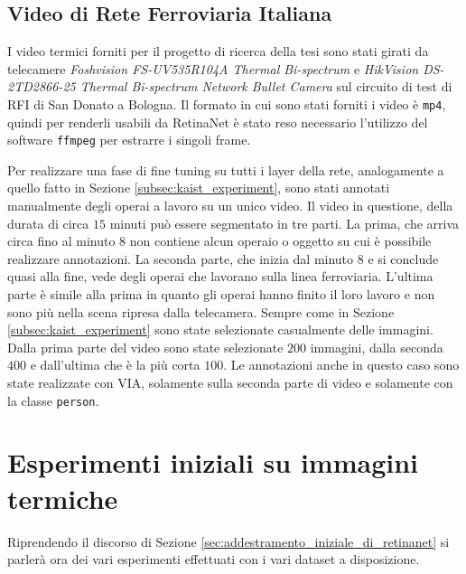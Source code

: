\subsection{Video di Rete Ferroviaria Italiana}
\label{subsec:rfi_video_experiment}
I video termici forniti per il progetto di ricerca della tesi sono stati girati da telecamere \textit{Foshvision FS-UV535R104A Thermal Bi-spectrum} e \textit{HikVision DS-2TD2866-25 Thermal Bi-spectrum Network Bullet Camera} sul circuito di test di \ac{RFI} di San Donato a Bologna.
Il formato in cui sono stati forniti i video è \texttt{mp4}, quindi per renderli usabili da RetinaNet è stato reso necessario l'utilizzo del software \texttt{ffmpeg} per estrarre i singoli frame. 

Per realizzare una fase di fine tuning su tutti i layer della rete, analogamente a quello fatto in Sezione \ref{subsec:kaist_experiment}, sono stati annotati manualmente degli operai a lavoro su un unico video.
Il video in questione, della durata di circa $15$ minuti può essere segmentato in tre parti. La prima, che arriva circa fino al minuto $8$ non contiene alcun operaio o oggetto su cui è possibile realizzare annotazioni. La seconda parte, che inizia dal minuto 8 e si conclude quasi alla fine, vede degli operai che lavorano sulla linea ferroviaria. L'ultima parte è simile alla prima in quanto gli operai hanno finito il loro lavoro e non sono più nella scena ripresa dalla telecamera. 
Sempre come in Sezione \ref{subsec:kaist_experiment} sono state selezionate casualmente delle immagini. Dalla prima parte del video sono state selezionate $200$ immagini, dalla seconda $400$ e dall'ultima che è la più corta $100$. Le annotazioni anche in questo caso sono state realizzate con \ac{VIA}, solamente sulla seconda parte di video e solamente con la classe \texttt{person}.
 

\section{Esperimenti iniziali su immagini termiche}
\label{sec:init_experiment_thermal}
Riprendendo il discorso di Sezione \ref{sec:addestramento_iniziale_di_retinanet} si parlerà ora dei vari esperimenti effettuati con i vari dataset a disposizione. 




